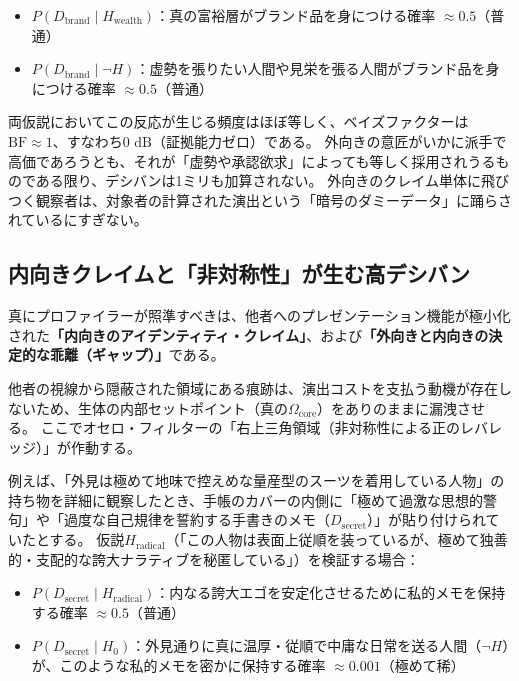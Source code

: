 \begin{itemize}
\item $P(D_{\mathrm{brand}} \mid H_{\mathrm{wealth}})$：真の富裕層がブランド品を身につける確率 $\approx 0.5$（普通）
\item $P(D_{\mathrm{brand}} \mid \neg H)$：虚勢を張りたい人間や見栄を張る人間がブランド品を身につける確率 $\approx 0.5$（普通）
\end{itemize}

両仮説においてこの反応が生じる頻度はほぼ等しく、ベイズファクターは$\mathrm{BF} \approx 1$、すなわち$0\text{ dB}$（証拠能力ゼロ）である。
外向きの意匠がいかに派手で高価であろうとも、それが「虚勢や承認欲求」によっても等しく採用されうるものである限り、デシバンは1ミリも加算されない。
外向きのクレイム単体に飛びつく観察者は、対象者の計算された演出という「暗号のダミーデータ」に踊らされているにすぎない。

\subsection{内向きクレイムと「非対称性」が生む高デシバン}
真にプロファイラーが照準すべきは、他者へのプレゼンテーション機能が極小化された\textbf{「内向きのアイデンティティ・クレイム」}、および\textbf{「外向きと内向きの決定的な乖離（ギャップ）」}である。

他者の視線から隠蔽された領域にある痕跡は、演出コストを支払う動機が存在しないため、生体の内部セットポイント（真の$\Omega_{\mathrm{core}}$）をありのままに漏洩させる。
ここでオセロ・フィルターの「右上三角領域（非対称性による正のレバレッジ）」が作動する。

例えば、「外見は極めて地味で控えめな量産型のスーツを着用している人物」の持ち物を詳細に観察したとき、手帳のカバーの内側に「極めて過激な思想的警句」や「過度な自己規律を誓約する手書きのメモ（$D_{\mathrm{secret}}$）」が貼り付けられていたとする。
仮説$H_{\mathrm{radical}}$（「この人物は表面上従順を装っているが、極めて独善的・支配的な誇大ナラティブを秘匿している」）を検証する場合：

\begin{itemize}
\item $P(D_{\mathrm{secret}} \mid H_{\mathrm{radical}})$：内なる誇大エゴを安定化させるために私的メモを保持する確率 $\approx 0.5$（普通）
\item $P(D_{\mathrm{secret}} \mid H_0)$：外見通りに真に温厚・従順で中庸な日常を送る人間（$\neg H$）が、このような私的メモを密かに保持する確率 $\approx 0.001$（極めて稀）
\end{itemize}

